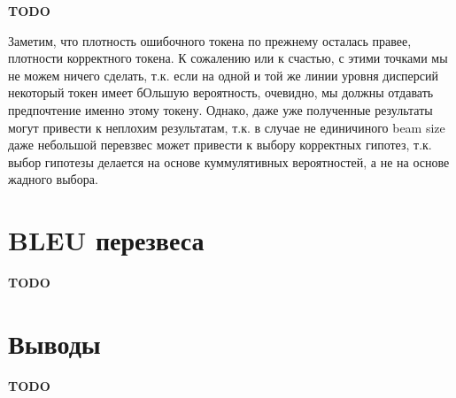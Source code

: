 \documentclass[a4paper,14pt]{extarticle}
\begin{document}
	 \begin{figure}[t]
	\end{figure}
	
	\textbf{TODO}
	
	Заметим, что плотность ошибочного токена по прежнему осталась правее, плотности корректного токена. К сожалению или к счастью, с этими точками мы не можем ничего сделать, т.к. если на одной и той же линии уровня дисперсий некоторый токен имеет бОльшую вероятность, очевидно, мы должны отдавать предпочтение именно этому токену. Однако, даже уже полученные результаты могут привести к неплохим результатам, т.к. в случае не единичиного beam size даже небольшой перевзвес может привести к выбору корректных гипотез, т.к. выбор гипотезы делается на основе куммулятивных вероятностей, а не на основе жадного выбора.
\section{BLEU перезвеса}
	\textbf{TODO}
	
\section{Выводы}
	\textbf{TODO}
	
	
	
\end{document}
